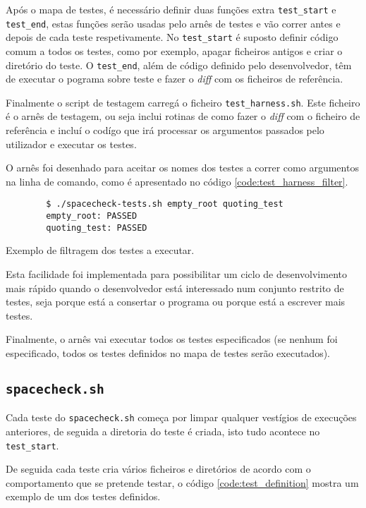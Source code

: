 Após o mapa de testes, é necessário definir duas funções extra \Verb|test_start|
e \Verb|test_end|, estas funções serão usadas pelo arnês de testes e vão correr
antes e depois de cada teste respetivamente. No \Verb|test_start| é suposto
definir código comum a todos os testes, como por exemplo, apagar ficheiros antigos
e criar o diretório do teste. O \Verb|test_end|, além de código definido pelo
desenvolvedor, têm de executar o pograma sobre teste e fazer o \emph{diff} com
os ficheiros de referência.

Finalmente o script de testagem carregá o ficheiro \Verb|test_harness.sh|. Este
ficheiro é o arnês de testagem, ou seja inclui rotinas de como fazer o
\emph{diff} com o ficheiro de referência e incluí o codígo que irá processar
os argumentos passados pelo utilizador e executar os testes.

O arnês foi desenhado para aceitar os nomes dos testes a correr como argumentos
na linha de comando, como é apresentado no código \ref{code:test_harness_filter}.

\begin{listing}[H]
	\centering
	\begin{verbatim}
		$ ./spacecheck-tests.sh empty_root quoting_test
		empty_root: PASSED
		quoting_test: PASSED
	\end{verbatim}
	\cprotect\caption{Exemplo de filtragem dos testes a executar.}
	\label{code:test_harness_filter}
\end{listing}

Esta facilidade foi implementada para possibilitar um ciclo de desenvolvimento
mais rápido quando o desenvolvedor está interessado num conjunto restrito de
testes, seja porque está a consertar o programa ou porque está a escrever mais
testes.

Finalmente, o arnês vai executar todos os testes especificados (se nenhum foi
especificado, todos os testes definidos no mapa de testes serão executados).

\cprotect\subsection{\Verb|spacecheck.sh|}

Cada teste do \Verb|spacecheck.sh| começa por limpar
qualquer vestígios de execuções anteriores, de seguida a diretoria do teste
é criada, isto tudo acontece no \Verb|test_start|.

De seguida cada teste cria vários ficheiros e diretórios de acordo com o
comportamento que se pretende testar, o código \ref{code:test_definition} mostra
um exemplo de um dos testes definidos.

